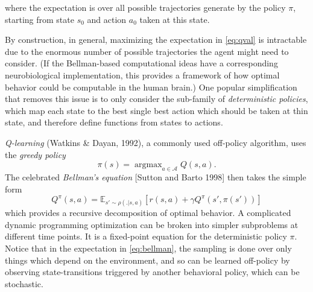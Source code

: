 \documentclass{article} %
\DeclareMathOperator{\argmax}{argmax}
\begin{document}
where the expectation is over all possible trajectories generate by the
policy $\pi$, starting from state $s_0$ and action $a_0$ taken at this
state.

By construction, in general, maximizing the expectation in  \eqref{eq:qval} is intractable due to
the enormous number of possible trajectories the agent might need to
consider.
(If the Bellman-based computational ideas have a corresponding
neurobiological implementation, this provides a framework of how
optimal behavior could be computable in the human brain.)
One popular simplification that removes this issue is to only consider the sub-family of
\textit{deterministic policies}, which map each state to the best single best action which
should be taken at thin state, and therefore define functions from states to actions.

\textit{Q-learning} (Watkins \& Dayan, 1992), a commonly used off-policy algorithm, uses the
\textit{greedy policy}
\begin{equation}
  \pi(s) = \argmax_{a \in \mathcal A}{Q}(s, a).
  \label{eq:qlearning}
\end{equation}
The celebrated \textit{Bellman's equation} [Sutton and Barto 1998] then takes the simple form
\begin{equation}
  Q^\pi(s, a) = \mathbb E_{s' \sim \rho(.|s,a)} [r(s,a) + \gamma Q^\pi(s', \pi(s'))]
  \label{eq:bellman}
\end{equation}
which provides a recursive decomposition of optimal behavior.
A complicated dynamic programming optimization can be
broken into simpler subproblems at different time points.
It is a fixed-point equation for the deterministic policy $\pi$.
Notice that in the expectation in \eqref{eq:bellman}, the sampling is done over only things which
depend on the environment, and so can be learned off-policy by observing state-transitions
triggered by another behavioral policy, which can be stochastic.
\end{document}
